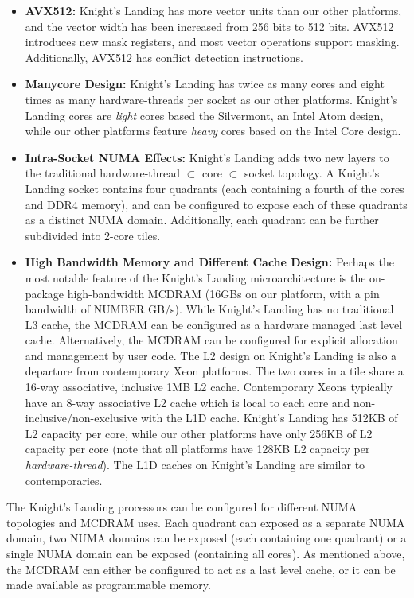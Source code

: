 \documentclass[conference]{IEEEtran}
\begin{document}
\begin{itemize}
\item \textbf{AVX512:} Knight's Landing has more vector units than our other
platforms, and the vector width has been increased from 256 bits to 512 bits.
AVX512 introduces new mask registers, and most vector operations support
masking. Additionally, AVX512 has conflict detection instructions. 
\item \textbf{Manycore Design:} Knight's Landing has twice as many
cores and eight times as many hardware-threads per socket as our
other platforms. Knight's Landing cores are \emph{light} cores based the Silvermont,
an Intel Atom design, while our other platforms feature \emph{heavy} cores based on
the Intel Core design.
\item \textbf{Intra-Socket NUMA Effects:} Knight's Landing adds two new layers
to the traditional hardware-thread \(\subset\) core \(\subset\) socket
topology. A Knight's Landing socket contains four quadrants (each containing a
fourth of the cores and DDR4 memory), and can be configured to expose each of
these quadrants as a distinct NUMA domain. Additionally, each quadrant can be
further subdivided into 2-core tiles.
\item \textbf{High Bandwidth Memory and Different Cache Design:}
Perhaps the most notable feature of the Knight's Landing microarchitecture is the
on-package high-bandwidth MCDRAM (16GBs on our platform, with a pin bandwidth
of NUMBER GB/s). While Knight's Landing has no traditional L3 cache, the MCDRAM
can be configured as a hardware managed last level cache. Alternatively, the MCDRAM
can be configured for explicit allocation and management by user code. The L2 
design on Knight's Landing is also a departure from contemporary Xeon platforms.
The two cores in a tile share a 16-way associative, inclusive 1MB L2 cache.
Contemporary Xeons typically have an 8-way associative L2 cache which is local
to each core and non-inclusive/non-exclusive with the L1D cache. Knight's
Landing has 512KB of L2 capacity per core, while our other platforms have only
256KB of L2 capacity per core (note that all platforms have 128KB L2 capacity
per \emph{hardware-thread}). The L1D caches on Knight's Landing are similar to
contemporaries.
\end{itemize}

The Knight's Landing processors can be configured for different NUMA topologies
and MCDRAM uses. Each quadrant can exposed as a separate NUMA domain, two NUMA
domains can be exposed (each containing one quadrant) or a single NUMA domain
can be exposed (containing all cores). As mentioned above, the MCDRAM can either
be configured to act as a last level cache, or it can be made available as
programmable memory.
\end{document}
